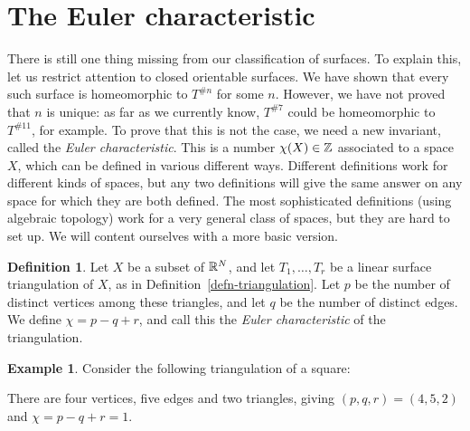 \documentclass[reqno]{amsart}
\theoremstyle{definition}
\newtheorem{definition}[theorem]{Definition}
\newtheorem{example}[theorem]{Example}
\begin{document}
\section{The Euler characteristic}
\label{sec-euler}

There is still one thing missing from our classification of surfaces.
To explain this, let us restrict attention to closed orientable
surfaces.  We have shown that every such surface is homeomorphic to
$T^{\# n}$ for some $n$.  However, we have not proved that $n$ is
unique: as far as we currently know, $T^{\# 7}$ could be homeomorphic
to $T^{\# 11}$, for example.  To prove that this is not the case, we
need a new invariant, called the \emph{Euler characteristic}.  This is
a number $\chi(X)\in\mathbb{Z}$ associated to a space $X$, which can be
defined in various different ways.  Different definitions work for
different kinds of spaces, but any two definitions will give the same
answer on any space for which they are both defined.  The most
sophisticated definitions (using algebraic topology) work for a very
general class of spaces, but they are hard to set up.  We will content
ourselves with a more basic version.

\begin{definition}
 Let $X$ be a subset of $\mathbb{R}^N$, and let $T_1,\dotsc,T_r$ be a linear
 surface triangulation of $X$, as in
 Definition~\ref{defn-triangulation}.  Let $p$ be the number of
 distinct vertices among these triangles, and let $q$ be the number of
 distinct edges.  We define $\chi=p-q+r$, and call this the
 \emph{Euler characteristic} of the triangulation.
\end{definition}

\begin{example}\label{eg-square-euler}
 Consider the following triangulation of a square:
 \begin{center}
 \end{center}
 There are four vertices, five edges and two triangles, giving
 $(p,q,r)=(4,5,2)$ and $\chi=p-q+r=1$.  
\end{example}
\end{document}

